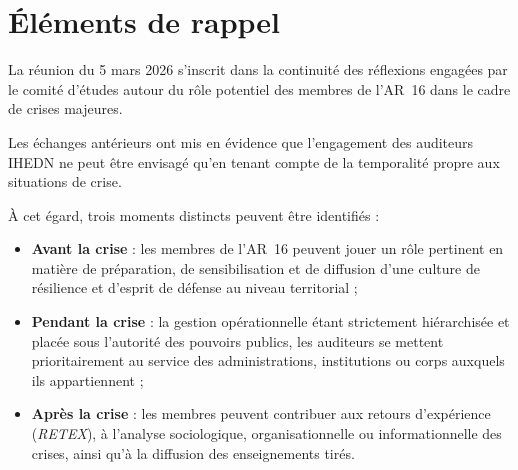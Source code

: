 \documentclass[12pt,a4paper]{article}
\begin{document}

\section{Éléments de rappel}

La réunion du 5 mars 2026 s'inscrit dans la continuité des réflexions engagées
par le comité d'études autour du rôle potentiel des membres de l'AR~16 dans
le cadre de crises majeures.

Les échanges antérieurs ont mis en évidence que l'engagement des auditeurs
IHEDN ne peut être envisagé qu'en tenant compte de la temporalité propre aux
situations de crise.

À cet égard, trois moments distincts peuvent être identifiés :

\begin{itemize}
    \item \textbf{Avant la crise} : les membres de l'AR~16 peuvent jouer un rôle pertinent en matière de préparation, de sensibilisation et de diffusion d'une culture de résilience et d'esprit de défense au niveau territorial ;
    
    \item \textbf{Pendant la crise} : la gestion opérationnelle étant strictement hiérarchisée et placée sous l'autorité des pouvoirs publics, les auditeurs se mettent prioritairement au service des administrations, institutions ou corps auxquels ils appartiennent ;
    
    \item \textbf{Après la crise} : les membres peuvent contribuer aux retours d'expérience (\textit{RETEX}), à l'analyse sociologique, organisationnelle ou informationnelle des crises, ainsi qu'à la diffusion des enseignements tirés.
\end{itemize}
\end{document}
